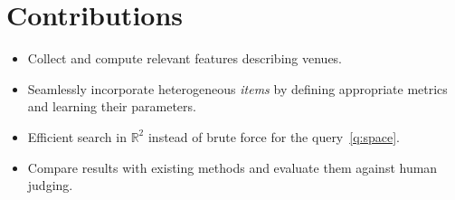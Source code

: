 \section{Contributions}

\begin{itemize}
	\item Collect and compute relevant features describing venues.
	\item Seamlessly incorporate heterogeneous \emph{items} by defining
		appropriate metrics and learning their parameters.
	\item Efficient search in $\mathbb{R}^2$ instead of brute force for
		the query~\ref{q:space}.
	\item Compare results with existing methods and evaluate them against
		human judging.
\end{itemize}
